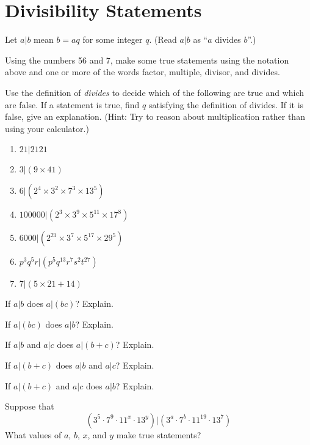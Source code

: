 \newpage
\section{Divisibility Statements}\label{A:divisibilityStatements}

Let $a|b$ mean $b=aq$ for some integer $q$.  (Read $a|b$ as ``$a$ divides $b$''.)  

\begin{prob}
Using the numbers 56 and 7, make some true statements using the notation above and one or more of the words factor, multiple, divisor, and divides.  
\end{prob}

\begin{prob}
Use the definition of \emph{divides} to decide which of the following are true and which are false.  If a statement is true, find $q$ satisfying the definition of divides.  If it is false, give an explanation.  (Hint:  Try to reason about multiplication rather than using your calculator.)
\begin{enumerate}
\item $21|2121$
\item $3|(9\times 41)$
\item $6|(2^4\times 3^2\times 7^3\times 13^5)$
\item $100000|(2^3\times 3^9\times 5^{11}\times 17^8)$
\item $6000|(2^{21}\times 3^7 \times 5^{17}\times 29^5)$
\item $p^3q^5r|(p^5q^{13}r^7s^2t^{27})$
\item $7|(5\times 21 + 14)$
\end{enumerate}
\end{prob}


\begin{prob}
If $a|b$ does $a|(bc)$?  Explain. 
\end{prob}

\begin{prob}
If $a|(bc)$ does $a|b$?  Explain. 
\end{prob}

\begin{prob}
If $a|b$ and $a|c$ does $a|(b+c)$?  Explain.  
\end{prob}

\begin{prob}
If $a|(b+c)$ does $a|b$ and $a|c$?  Explain.  
\end{prob}

\begin{prob}
If $a|(b+c)$ and $a|c$ does $a|b$?  Explain.  
\end{prob}

\begin{prob}
Suppose that $$(3^5\cdot 7^9\cdot 11^x\cdot 13^y)|(3^a\cdot 7^b\cdot 11^{19}\cdot 13^7)$$
What values of $a$, $b$, $x$, and $y$ make true statements? 
\end{prob}
